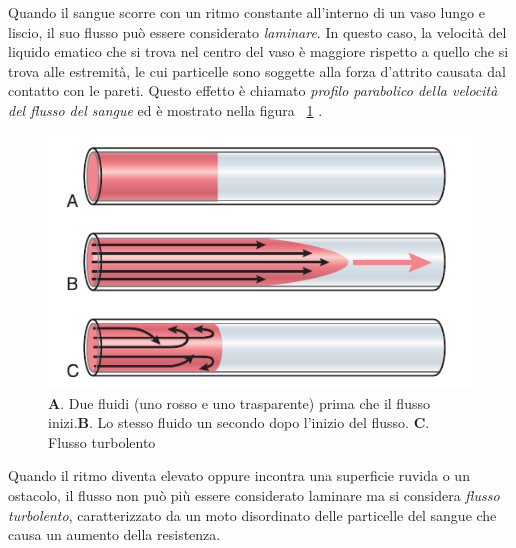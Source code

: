 Quando il sangue scorre con un ritmo constante all'interno di un vaso lungo e liscio, il suo flusso può essere considerato \textit{laminare}. In questo caso, la velocità del liquido ematico che si trova nel centro del vaso è maggiore rispetto a quello che si trova alle estremità, le cui particelle sono soggette alla forza d'attrito causata dal contatto con le pareti. Questo effetto è chiamato \textit{profilo parabolico della velocità del flusso del sangue} ed è mostrato nella figura \Fig~\ref{fig:FlussoParabolico} .
\begin{figure}[h]
	\centering
	\includegraphics[width=0.7\linewidth]{ImageFiles/Fotopletismografia/FlussoParabolico}
	\caption{\textbf{A}. Due fluidi (uno rosso e uno trasparente) prima che il flusso inizi.\textbf{B}. Lo stesso fluido un secondo dopo l'inizio del flusso. \textbf{C}. Flusso turbolento}
	\label{fig:FlussoParabolico}
\end{figure}
Quando il ritmo diventa elevato oppure incontra una superficie ruvida o un ostacolo, il flusso non può più essere considerato laminare ma si considera \textit{flusso turbolento}, caratterizzato da un moto disordinato delle particelle del sangue che causa un aumento della resistenza.

